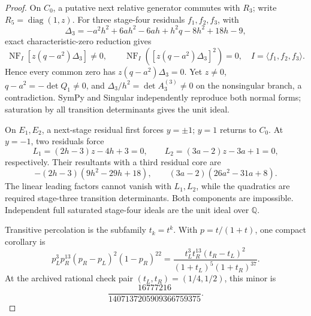 \begin{proof}
On \(C_0\), a putative next relative generator commutes with \(R_3\); write
\(R_5=\operatorname{diag}(1,z)\).  For three stage-four residuals
\(f_1,f_2,f_3\), with
\begin{equation}
 \Delta_3=-a^2h^2+6ah^2-6ah+h^2q-8h^2+18h-9 ,
\end{equation}
exact characteristic-zero reduction gives
\begin{equation}
 \operatorname{NF}_{I}\!\left[z(q-a^2)\Delta_3\right]\ne0,\qquad
 \operatorname{NF}_{I}\!\left([z(q-a^2)\Delta_3]^2\right)=0,
 \quad I=\langle f_1,f_2,f_3\rangle .
\label{eq:bcgr-delayed-radical}
\end{equation}
Hence every common zero has
\(z(q-a^2)\Delta_3=0\).  Yet \(z\ne0\),
\(q-a^2=-\det Q_1\ne0\), and
\(\Delta_3/h^2=\det A_3^{(3)}\ne0\) on the nonsingular branch, a
contradiction.  SymPy and Singular independently reproduce both normal
forms; saturation by all transition determinants gives the unit ideal.

On \(E_1,E_2\), a next-stage residual first forces \(y=\pm1\); \(y=1\)
returns to \(C_0\).  At \(y=-1\), two residuals force
\[
L_1=(2h-3)z-4h+3=0,\qquad
L_2=(3a-2)z-3a+1=0,
\]
respectively.  Their resultants with a third residual core are
\[
-(2h-3)(9h^2-29h+18),\qquad
(3a-2)(26a^2-31a+8).
\]
The linear leading factors cannot vanish with \(L_1,L_2\), while the
quadratics are required stage-three transition determinants.  Both
components are impossible.  Independent full saturated stage-four ideals
are the unit ideal over \(\mathbb Q\).

Transitive percolation is the subfamily \(t_k=t^k\).  With
\(p=t/(1+t)\), one compact corollary is
\[
 p_L^3p_R^{13}(p_R-p_L)^2(1-p_R)^{22}
 =
 \frac{t_L^3t_R^{13}(t_R-t_L)^2}
 {(1+t_L)^5(1+t_R)^{37}} .
\]
At the archived rational check pair
\((t_L,t_R)=(1/4,1/2)\), this minor is
\[
 \frac{16777216}{1407137205909366759375}.
\]
\end{proof}

